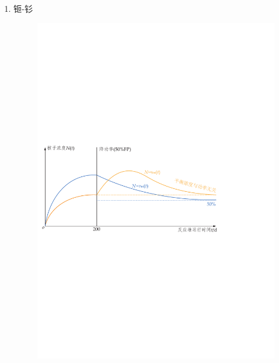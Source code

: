 \begin{exercise}
\begin{solution}
\begin{enumerate}[(1)]
            \item 钷-钐
            \begin{figure}[H]
                \centering
                \includegraphics[scale=0.75]{figures/fig6.6.pdf}
            \end{figure}
        \end{enumerate}
    \end{solution}
\end{exercise}

